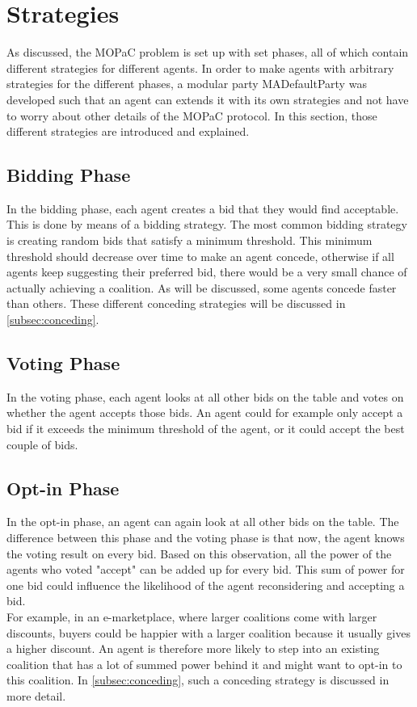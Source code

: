 \section{Strategies}
\label{sec:strategies}

    As discussed, the MOPaC problem is set up with set phases, all of which contain different strategies for different agents. In order to make agents with arbitrary strategies for the different phases, a modular party MADefaultParty was developed such that an agent can extends it with its own strategies and not have to worry about other details of the MOPaC protocol. In this section, those different strategies are introduced and explained. 

    \subsection{Bidding Phase}
    \label{subsec:bidding}
        In the bidding phase, each agent creates a bid that they would find acceptable. This is done by means of a bidding strategy. The most common bidding strategy is creating random bids that satisfy a minimum threshold. 
        This minimum threshold should decrease over time to make an agent concede, otherwise if all agents keep suggesting their preferred bid, there would be a very small chance of actually achieving a coalition. As will be discussed, some agents concede faster than others. These different conceding strategies will be discussed in \autoref{subsec:conceding}.

    \subsection{Voting Phase}
    \label{subsec:voting}
        In the voting phase, each agent looks at all other bids on the table and votes on whether the agent accepts those bids. An agent could for example only accept a bid if it exceeds the minimum threshold of the agent, or it could accept the best couple of bids.

    \subsection{Opt-in Phase}
    \label{subsec:optin}
        In the opt-in phase, an agent can again look at all other bids on the table. The difference between this phase and the voting phase is that now, the agent knows the voting result on every bid. Based on this observation, all the power of the agents who voted "accept" can be added up for every bid. This sum of power for one bid could influence the likelihood of the agent reconsidering and accepting a bid. \\
        For example, in an e-marketplace, where larger coalitions come with larger discounts, buyers could be happier with a larger coalition because it usually gives a higher discount. An agent is therefore more likely to step into an existing coalition that has a lot of summed power behind it and might want to opt-in to this coalition. In \autoref{subsec:conceding}, such a conceding strategy is discussed in more detail.
        
